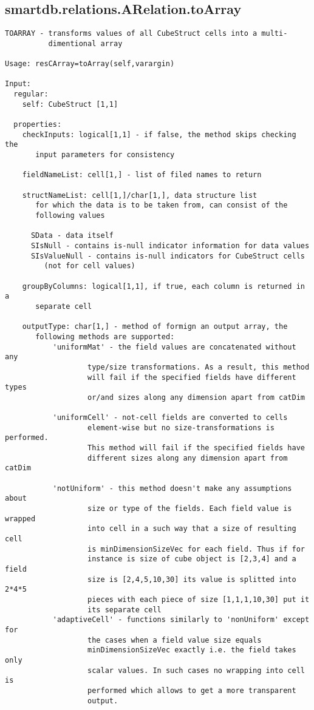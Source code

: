 \subsection{\texorpdfstring{smartdb.relations.ARelation.toArray}{toArray}}\label{method:smartdb.relations.ARelation.toArray}
\begin{verbatim}
TOARRAY - transforms values of all CubeStruct cells into a multi-
          dimentional array

Usage: resCArray=toArray(self,varargin)

Input:
  regular:
    self: CubeStruct [1,1]

  properties:
    checkInputs: logical[1,1] - if false, the method skips checking the
       input parameters for consistency

    fieldNameList: cell[1,] - list of filed names to return

    structNameList: cell[1,]/char[1,], data structure list
       for which the data is to be taken from, can consist of the
       following values

      SData - data itself
      SIsNull - contains is-null indicator information for data values
      SIsValueNull - contains is-null indicators for CubeStruct cells
         (not for cell values)

    groupByColumns: logical[1,1], if true, each column is returned in a
       separate cell

    outputType: char[1,] - method of formign an output array, the
       following methods are supported:
           'uniformMat' - the field values are concatenated without any
                   type/size transformations. As a result, this method
                   will fail if the specified fields have different types
                   or/and sizes along any dimension apart from catDim

           'uniformCell' - not-cell fields are converted to cells
                   element-wise but no size-transformations is performed.
                   This method will fail if the specified fields have
                   different sizes along any dimension apart from catDim

           'notUniform' - this method doesn't make any assumptions about
                   size or type of the fields. Each field value is wrapped
                   into cell in a such way that a size of resulting cell
                   is minDimensionSizeVec for each field. Thus if for
                   instance is size of cube object is [2,3,4] and a field
                   size is [2,4,5,10,30] its value is splitted into 2*4*5
                   pieces with each piece of size [1,1,1,10,30] put it
                   its separate cell
           'adaptiveCell' - functions similarly to 'nonUniform' except for
                   the cases when a field value size equals
                   minDimensionSizeVec exactly i.e. the field takes only
                   scalar values. In such cases no wrapping into cell is
                   performed which allows to get a more transparent
                   output.


\end{verbatim}
